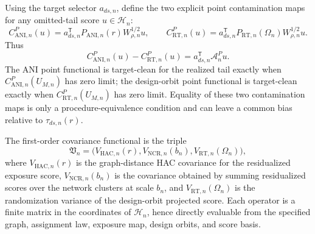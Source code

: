 \documentclass[11pt]{article}
\newcommand{\transpose}{\mathsf{T}}
\theoremstyle{definition}
\theoremstyle{plain}
\theoremstyle{remark}
\begin{document}
Using the target selector \(a_{ds,n}\), define the two explicit point
contamination maps for any omitted-tail score \(u\in\mathcal H_n\):
\[
  C^P_{\mathrm{ANI},n}(u)
  =
  a_{ds,n}^{\transpose}P_{\mathrm{ANI},n}(r)W_{\rho,n}^{1/2}u,
  \qquad
  C^P_{\mathrm{RT},n}(u)
  =
  a_{ds,n}^{\transpose}P_{\mathrm{RT},n}(\Omega_n)W_{\rho,n}^{1/2}u.
\]
Thus
\[
  C^P_{\mathrm{ANI},n}(u)-C^P_{\mathrm{RT},n}(u)
  =
  a_{ds,n}^{\transpose}\mathcal A^P_nu.
\]
The ANI point functional is target-clean for the realized tail exactly when
\(C^P_{\mathrm{ANI},n}(U_{M,n})\) has zero limit; the design-orbit point
functional is target-clean exactly when \(C^P_{\mathrm{RT},n}(U_{M,n})\) has
zero limit.  Equality of these two contamination maps is only a
procedure-equivalence condition and can leave a common bias relative to
\(\tau_{ds,n}(r)\).

The first-order covariance functional is the triple
\[
  \mathfrak V_n
  =
  \bigl(
    V_{\mathrm{HAC},n}(r),
    V_{\mathrm{NCR},n}(b_n),
    V_{\mathrm{RT},n}(\Omega_n)
  \bigr),
\]
where \(V_{\mathrm{HAC},n}(r)\) is the graph-distance HAC covariance for the
residualized exposure score, \(V_{\mathrm{NCR},n}(b_n)\) is the covariance
obtained by summing residualized scores over the network clusters at scale
\(b_n\), and \(V_{\mathrm{RT},n}(\Omega_n)\) is the randomization variance of
the design-orbit projected score.  Each operator is a finite matrix in the
coordinates of \(\mathcal H_n\), hence directly evaluable from the specified
graph, assignment law, exposure map, design orbits, and score basis.
\end{document}
